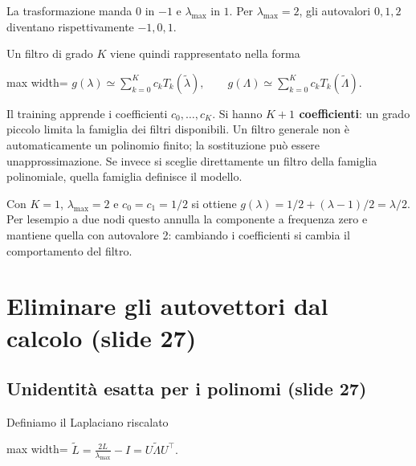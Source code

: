 \documentclass[11pt,a4paper,oneside,openany]{book}
\begin{document}
La trasformazione manda \(0\) in \(-1\) e \(\lambda_{\max}\) in \(1\). Per \(\lambda_{\max}=2\), gli autovalori \(0,1,2\) diventano rispettivamente \(-1,0,1\).

Un filtro di grado \(K\) viene quindi rappresentato nella forma

\begin{center}
\begin{adjustbox}{max width=\linewidth}
$\displaystyle g(\lambda)\simeq\sum_{k=0}^Kc_kT_k(\widetilde\lambda),\qquad
g(\Lambda)\simeq\sum_{k=0}^Kc_kT_k(\widetilde\Lambda).$
\end{adjustbox}
\end{center}

Il training apprende i coefficienti \(c_0,\ldots,c_K\). Si hanno \textbf{\(K+1\) coefficienti}: un grado piccolo limita la famiglia dei filtri disponibili. Un filtro generale non è automaticamente un polinomio finito; la sostituzione può essere un\textquotesingle approssimazione. Se invece si sceglie direttamente un filtro della famiglia polinomiale, quella famiglia definisce il modello.

Con \(K=1\), \(\lambda_{\max}=2\) e \(c_0=c_1=1/2\) si ottiene \(g(\lambda)=1/2+(\lambda-1)/2=\lambda/2\). Per l\textquotesingle esempio a due nodi questo annulla la componente a frequenza zero e mantiene quella con autovalore 2: cambiando i coefficienti si cambia il comportamento del filtro.

\section{Eliminare gli autovettori dal calcolo (slide 27)}\label{f05-r439}

\subsection{Un\textquotesingle identità esatta per i polinomi (slide 27)}\label{f05-r441}

Definiamo il Laplaciano riscalato

\begin{center}
\begin{adjustbox}{max width=\linewidth}
$\displaystyle \widetilde L=\frac{2L}{\lambda_{\max}}-I=U\widetilde\Lambda U^\top.$
\end{adjustbox}
\end{center}
\end{document}
